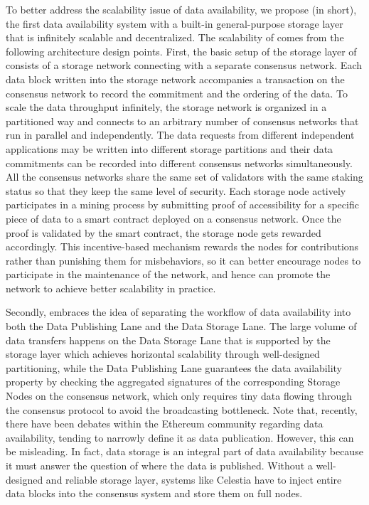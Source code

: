 To better address the scalability issue of data availability, we propose \project (\projabbrev in short), the first data availability system with a built-in general-purpose storage layer that is infinitely scalable and decentralized. The scalability of \projabbrev comes from the following architecture design points. 
First, the basic setup of the storage layer of \projabbrev consists of a storage network connecting with a separate consensus network. Each data block written into the storage network accompanies a transaction on the consensus network to record the commitment and the ordering of the data. 
To scale the data throughput infinitely, the storage network is organized in a partitioned way and connects to an arbitrary number of consensus networks that run in parallel and independently. 
The data requests from different independent applications may be written into different storage partitions and their data commitments can be recorded into different consensus networks simultaneously.
All the consensus networks share the same set of validators with the same staking status so that they keep the same level of security.    
Each storage node actively participates in a mining process by submitting proof of accessibility for a specific piece of data to a smart contract deployed on a consensus network. Once the proof is validated by the smart contract, the storage node gets rewarded accordingly. 
This incentive-based mechanism rewards the nodes for contributions rather than punishing them for misbehaviors, so it can better encourage nodes to participate in the maintenance of the network, and hence can promote the network to achieve better scalability in practice.

Secondly, \projabbrev embraces the idea of separating the workflow of data availability into both the Data Publishing Lane and the Data Storage Lane. 
The large volume of data transfers happens on the Data Storage Lane that is supported by the storage layer which achieves horizontal scalability through well-designed partitioning, while the Data Publishing Lane guarantees the data availability property by checking the aggregated signatures of the corresponding Storage Nodes on the consensus network, which only requires tiny data flowing through the consensus protocol to avoid the broadcasting bottleneck. 
Note that, recently, there have been debates within the Ethereum community regarding data availability, tending to narrowly define it as data publication. However, this can be misleading. In fact, data storage is an integral part of data availability because it must answer the question of where the data is published. Without a well-designed and reliable storage layer, systems like Celestia have to inject entire data blocks into the consensus system and store them on full nodes.

